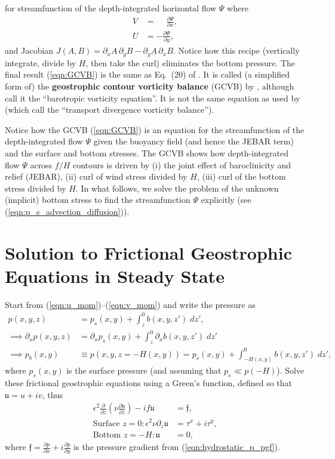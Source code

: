 \documentclass[10pt]{amsart}
\begin{document}
for streamfunction of the depth-integrated horizontal flow $\Psi$ where
\begin{align}
V & = \phantom{-} \frac{\partial \Psi}{\partial x}, \nonumber \\
U & = - \frac{\partial \Psi}{\partial y} ,
\label{eqn:streamfunction_def}
\end{align}
and Jacobian $J(A,B) = \partial_x A \, \partial_y B - \partial_y A \, \partial_x B$.
Notice how this recipe (vertically integrate, divide by $H$, then take the curl) eliminates the bottom pressure.
The final result (\ref{eqn:GCVB}) is the same as Eq.~(20) of \citet{peterson&callies26}.
It is called (a simplified form of) the \textbf{geostrophic contour vorticity balance} (GCVB) by \citet{waldman&giordani23}, although \citet{peterson&callies26} call it the ``barotropic vorticity equation''.
It is not the same equation as used by \citet{nost&isachsen03} (which \citet{waldman&giordani23} call the ``transport divergence vorticity balance'').

Notice how the GCVB (\ref{eqn:GCVB}) is an equation for the streamfunction of the depth-integrated flow $\Psi$ given the buoyancy field (and hence the JEBAR term) and the surface and bottom stresses.
The GCVB shows how depth-integrated flow $\Psi$ across $f/H$ contours is driven by (i) the joint effect of baroclinicity and relief (JEBAR), (ii) curl of wind stress divided by $H$, (iii) curl of the bottom stress divided by $H$.
In what follows, we solve the problem of the unknown (implicit) bottom stress to find the streamfunction $\Psi$ explicitly (see (\ref{eqn:p_s_advection_diffusion})).

\section{Solution to Frictional Geostrophic Equations in Steady State}
\label{sect:FGE_soln}
Start from (\ref{eqn:u_mom})--(\ref{eqn:v_mom}) and write the pressure as
\begin{align}
p(x,y,z) & = p_s(x,y) + \int_{z}^{0} b(x,y,z') \; dz' , \label{eqn:hydrostatic_p} \\
\implies \partial_x p(x,y,z) & = \partial_x p_s (x, y) + \int_{z}^{0} \partial_x b(x,y,z') \; dz'  \label{eqn:hydrostatic_p_pgf} \\
\implies p_b(x, y) & \equiv p(x, y, z=-H(x,y)) = p_s(x,y) + \int_{-H(x,y)}^{0} b(x,y,z') \; dz' , \label{eqn:pb} 
\end{align}
where $p_s(x,y)$ is the surface pressure (and assuming that $p_s \ll p(-H)$).
Solve these frictional geostrophic equations using a Green's function, defined so that $\mathfrak{u} = u + i v$, thus
\begin{align}
\epsilon^2 \frac{\partial}{\partial z} \left( \nu  \frac{\partial \mathfrak{u}}{\partial z} \right)  - i f  \mathfrak{u} & = \mathfrak{f} ,  \\
\text{Surface~}z = 0:
\epsilon^2 \nu \partial_z \mathfrak{u} & = \tau^x + i \tau^y , \label{eqn:sfc_bcs}
 \\
\text{Bottom~}z = -H:
\mathfrak{u} & = 0 ,
\end{align}
where $\mathfrak{f} = \frac{\partial p}{\partial x} +  i \frac{\partial p}{\partial y}$ is the pressure gradient from (\ref{eqn:hydrostatic_p_pgf}).
\end{document}

